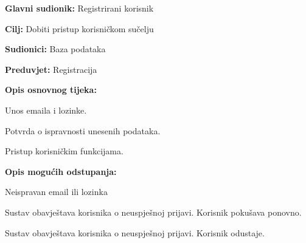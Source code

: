 				\begin{packed_item}
					
					\item \textbf{Glavni sudionik: }Registrirani korisnik
					\item  \textbf{Cilj:} Dobiti pristup korisničkom sučelju
					\item  \textbf{Sudionici:} Baza podataka
					\item  \textbf{Preduvjet:} Registracija
					\item  \textbf{Opis osnovnog tijeka:}
					
					\item[] \begin{packed_enum}
						
						\item Unos emaila i lozinke.
						\item Potvrda o ispravnosti unesenih podataka.
						\item Pristup korisničkim funkcijama.
					\end{packed_enum}
					
					\item  \textbf{Opis mogućih odstupanja:}
					
					\item[] \begin{packed_item}
						
						\item[2.a] Neispravan email ili lozinka
						\item[] \begin{packed_enum}
							
							\item  Sustav obavještava korisnika o neuspješnoj prijavi. Korisnik pokušava ponovno.
							\item Sustav obavještava korisnika o neuspješnoj prijavi. Korisnik odustaje.
							
						\end{packed_enum}
						
					\end{packed_item}
				\end{packed_item}
				\noindent {}

